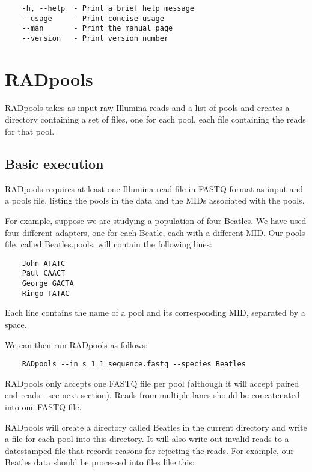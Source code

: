 \documentclass[a4paper]{article}
\begin{document}
\begin{verbatim}
    -h, --help  - Print a brief help message
    --usage     - Print concise usage
    --man       - Print the manual page
    --version   - Print version number
\end{verbatim}

\section{RADpools}

RADpools takes as input raw Illumina reads and a list of pools and creates a directory containing a set of files, one for each pool, each file containing the reads for that pool.

\subsection{Basic execution}

RADpools requires at least one Illumina read file in FASTQ format as input and a pools file, listing the pools in the data and the MIDs associated with the pools.

For example, suppose we are studying a population of four Beatles. We have used four different adapters, one for each Beatle, each with a different MID. Our pools file, called Beatles.pools, will contain the following lines:

\begin{verbatim}
    John ATATC
    Paul CAACT
    George GACTA
    Ringo TATAC
\end{verbatim}

Each line contains the name of a pool and its corresponding MID, separated by a space.

We can then run RADpools as follows:

\begin{verbatim}
    RADpools --in s_1_1_sequence.fastq --species Beatles
\end{verbatim}

RADpools only accepts one FASTQ file per pool (although it will accept paired end reads - see next section). Reads from multiple lanes should be concatenated into one FASTQ file.

RADpools will create a directory called Beatles in the current directory and write a file for each pool into this directory. It will also write out invalid reads to a datestamped file that records reasons for rejecting the reads. For example, our Beatles data should be processed into files like this:
\end{document}
